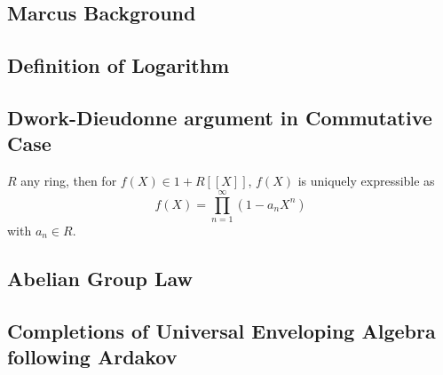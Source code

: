 \subsection{Marcus Background}
\subsection{Definition of Logarithm}
\subsection{Dwork-Dieudonne argument in Commutative Case}

$R$ any ring, then for $f(X)\in 1+R[[X]]$, $f(X)$ is uniquely expressible as 
$$f(X) = \prod_{n=1}^\infty (1-a_n X^n)$$ with $a_n\in R$.
\subsection{Abelian Group Law}
\subsection{Completions of Universal Enveloping Algebra following Ardakov}
